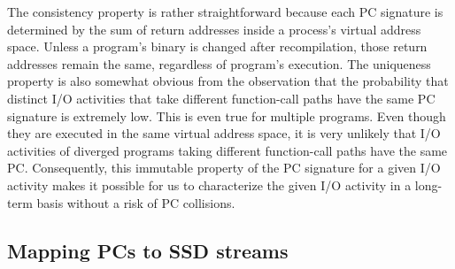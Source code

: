The consistency property is rather straightforward because each PC signature is
determined by the sum of return addresses inside a process's virtual address
space.  Unless a program's binary is changed after recompilation, those return
addresses remain the same, regardless of program's execution.  The uniqueness property 
is also somewhat obvious from the observation that the probability that
distinct I/O activities that take different function-call paths have the same
PC signature is extremely low. This is even true for multiple programs. Even
though they are executed in the same virtual address space, it is very unlikely
that I/O activities of diverged programs taking different function-call paths
have the same PC.  Consequently, this immutable property of the PC signature
for a given I/O activity makes it possible for us to characterize the given I/O
activity in a long-term basis without a risk of PC collisions.


\subsection{Mapping PCs to SSD streams}

